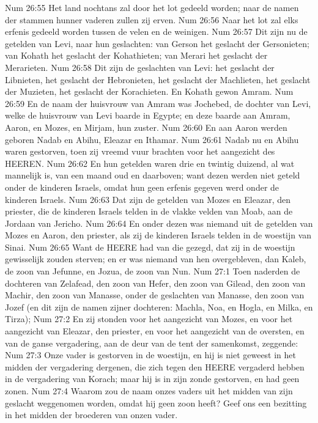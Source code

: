 Num 26:55  Het land nochtans zal door het lot gedeeld worden; naar de namen der stammen hunner vaderen zullen zij erven.
Num 26:56  Naar het lot zal elks erfenis gedeeld worden tussen de velen en de weinigen.
Num 26:57  Dit zijn nu de getelden van Levi, naar hun geslachten: van Gerson het geslacht der Gersonieten; van Kohath het geslacht der Kohathieten; van Merari het geslacht der Merarieten.
Num 26:58  Dit zijn de geslachten van Levi: het geslacht der Libnieten, het geslacht der Hebronieten, het geslacht der Machlieten, het geslacht der Muzieten, het geslacht der Korachieten. En Kohath gewon Amram.
Num 26:59  En de naam der huisvrouw van Amram was Jochebed, de dochter van Levi, welke de huisvrouw van Levi baarde in Egypte; en deze baarde aan Amram, Aaron, en Mozes, en Mirjam, hun zuster.
Num 26:60  En aan Aaron werden geboren Nadab en Abihu, Eleazar en Ithamar.
Num 26:61  Nadab nu en Abihu waren gestorven, toen zij vreemd vuur brachten voor het aangezicht des HEEREN.
Num 26:62  En hun getelden waren drie en twintig duizend, al wat mannelijk is, van een maand oud en daarboven; want dezen werden niet geteld onder de kinderen Israels, omdat hun geen erfenis gegeven werd onder de kinderen Israels.
Num 26:63  Dat zijn de getelden van Mozes en Eleazar, den priester, die de kinderen Israels telden in de vlakke velden van Moab, aan de Jordaan van Jericho.
Num 26:64  En onder dezen was niemand uit de getelden van Mozes en Aaron, den priester, als zij de kinderen Israels telden in de woestijn van Sinai.
Num 26:65  Want de HEERE had van die gezegd, dat zij in de woestijn gewisselijk zouden sterven; en er was niemand van hen overgebleven, dan Kaleb, de zoon van Jefunne, en Jozua, de zoon van Nun.
Num 27:1  Toen naderden de dochteren van Zelafead, den zoon van Hefer, den zoon van Gilead, den zoon van Machir, den zoon van Manasse, onder de geslachten van Manasse, den zoon van Jozef (en dit zijn de namen zijner dochteren: Machla, Noa, en Hogla, en Milka, en Tirza);
Num 27:2  En zij stonden voor het aangezicht van Mozes, en voor het aangezicht van Eleazar, den priester, en voor het aangezicht van de oversten, en van de ganse vergadering, aan de deur van de tent der samenkomst, zeggende:
Num 27:3  Onze vader is gestorven in de woestijn, en hij is niet geweest in het midden der vergadering dergenen, die zich tegen den HEERE vergaderd hebben in de vergadering van Korach; maar hij is in zijn zonde gestorven, en had geen zonen.
Num 27:4  Waarom zou de naam onzes vaders uit het midden van zijn geslacht weggenomen worden, omdat hij geen zoon heeft? Geef ons een bezitting in het midden der broederen van onzen vader.
